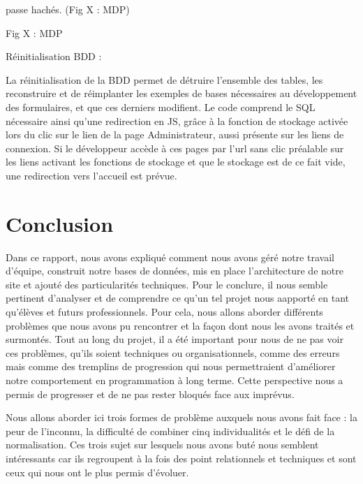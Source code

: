 \documentclass[12pt]{report}
\begin{document}
passe hachés. (Fig X : MDP)
\bigskip
\par    
Fig X : MDP
\bigskip
\par    
Réinitialisation BDD :
\bigskip
\par                
La réinitialisation de la BDD permet de détruire l’ensemble des tables, les reconstruire et de
réimplanter les exemples de bases nécessaires au développement des formulaires, et que ces
derniers modifient. Le code comprend le SQL nécessaire ainsi qu’une redirection en JS, grâce à la
fonction de stockage activée lors du clic sur le lien de la page Administrateur, aussi présente sur les
liens de connexion. Si le développeur accède à ces pages par l’url sans clic préalable sur les liens
activant les fonctions de stockage et que le stockage est de ce fait vide, une redirection vers
l’accueil est prévue.
\bigskip
\par    
        \chapter{Conclusion}
        \par
        Dans ce rapport, nous avons expliqué comment nous avons géré notre travail d’équipe, construit notre bases de données, mis en place l’architecture de notre site et ajouté des particularités techniques. Pour le conclure, il nous semble pertinent d’analyser et de comprendre ce qu’un tel projet nous aapporté en tant qu’élèves et futurs professionnels. Pour cela, nous allons aborder différents problèmes que nous avons pu rencontrer et la façon dont nous les avons traités et surmontés. Tout au long du projet, il a été important pour nous de ne pas voir ces problèmes, qu’ils soient techniques ou organisationnels, comme des erreurs mais comme des tremplins de progression qui nous permettraient d’améliorer notre comportement en programmation à long terme. Cette perspective nous a permis de progresser et de ne pas rester bloqués face aux imprévus.
        \par
        Nous allons aborder ici trois formes de problème auxquels nous avons fait face : la peur de l’inconnu, la difficulté de combiner cinq individualités et le défi de la normalisation. Ces trois sujet sur lesquels nous avons buté nous semblent intéressants car ils regroupent à la fois des point relationnels et techniques et sont ceux qui nous ont le plus permis d’évoluer.
        
\end{document}
